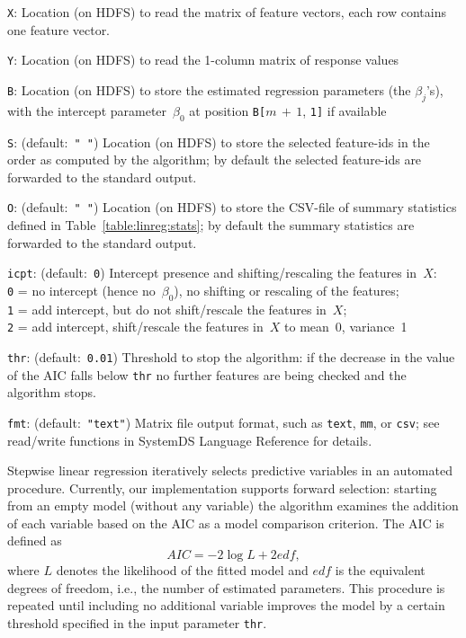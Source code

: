 \smallskip
{}
\begin{Description}
\item[{\tt X}:]
Location (on HDFS) to read the matrix of feature vectors, each row contains
one feature vector.
\item[{\tt Y}:]
Location (on HDFS) to read the 1-column matrix of response values
\item[{\tt B}:]
Location (on HDFS) to store the estimated regression parameters (the $\beta_j$'s), with the
intercept parameter~$\beta_0$ at position {\tt B[}$m\,{+}\,1$, {\tt 1]} if available
\item[{\tt S}:] (default:\mbox{ }{\tt " "})
Location (on HDFS) to store the selected feature-ids in the order as computed by the algorithm;
by default the selected feature-ids are forwarded to the standard output.
\item[{\tt O}:] (default:\mbox{ }{\tt " "})
Location (on HDFS) to store the CSV-file of summary statistics defined in
Table~\ref{table:linreg:stats}; by default the summary statistics are forwarded to the standard output.
\item[{\tt icpt}:] (default:\mbox{ }{\tt 0})
Intercept presence and shifting/rescaling the features in~$X$:\\
{\tt 0} = no intercept (hence no~$\beta_0$), no shifting or rescaling of the features;\\
{\tt 1} = add intercept, but do not shift/rescale the features in~$X$;\\
{\tt 2} = add intercept, shift/rescale the features in~$X$ to mean~0, variance~1
\item[{\tt thr}:] (default:\mbox{ }{\tt 0.01})
Threshold to stop the algorithm: if the decrease in the value of the AIC falls below {\tt thr}
no further features are being checked and the algorithm stops.
\item[{\tt fmt}:] (default:\mbox{ }{\tt "text"})
Matrix file output format, such as {\tt text}, {\tt mm}, or {\tt csv};
see read/write functions in SystemDS Language Reference for details.
\end{Description}


\smallskip

Stepwise linear regression iteratively selects predictive variables in an automated procedure.
Currently, our implementation supports forward selection: starting from an empty model (without any variable) 
the algorithm examines the addition of each variable based on the AIC as a model comparison criterion. The AIC is defined as  
\begin{equation}
AIC = -2 \log{L} + 2 edf,\label{eq:AIC}
\end{equation}    
where $L$ denotes the likelihood of the fitted model and $edf$ is the equivalent degrees of freedom, i.e., the number of estimated parameters. 
This procedure is repeated until including no additional variable improves the model by a certain threshold 
specified in the input parameter {\tt thr}. 

